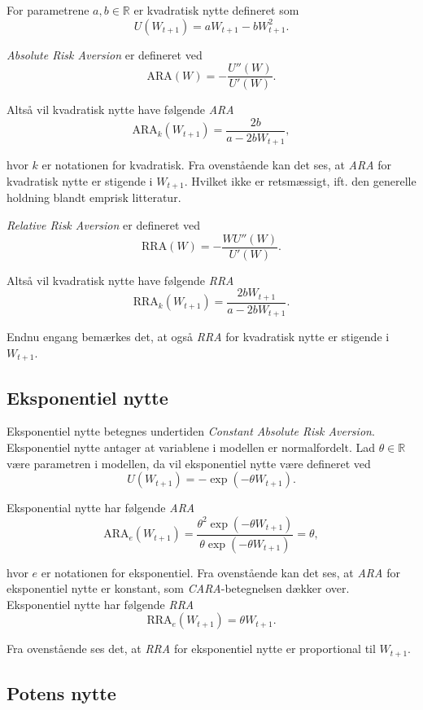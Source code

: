 \documentclass[
  a4paper,
  oneside]{memoir}
\begin{document}
For parametrene \(a,b\in\mathbb{R}\) er kvadratisk nytte defineret som
\begin{equation*}
U(W_{t+1})=aW_{t+1}-bW_{t+1}^2.
\end{equation*}

\emph{Absolute Risk Aversion} er defineret ved
\[\text{ARA}(W)=-\frac{U''(W)}{U'(W)}.\]

Altså vil kvadratisk nytte have følgende \emph{ARA}
\[\text{ARA}_k(W_{t+1})=\frac{2b}{a-2bW_{t+1}},\]

hvor \(k\) er notationen for kvadratisk. Fra ovenstående kan det ses, at \emph{ARA} for kvadratisk nytte er stigende i \(W_{t+1}\). Hvilket ikke er retsmæssigt, ift. den generelle holdning blandt emprisk litteratur.

\emph{Relative Risk Aversion} er defineret ved
\[\text{RRA}(W)=-\frac{WU''(W)}{U'(W)}.\]

Altså vil kvadratisk nytte have følgende \emph{RRA}
\[\text{RRA}_k(W_{t+1})= \frac{2bW_{t+1}}{a-2bW_{t+1}}.\]

Endnu engang bemærkes det, at også \emph{RRA} for kvadratisk nytte er stigende i \(W_{t+1}\).

\hypertarget{eksponentiel-nytte-1}{%
\subsection{Eksponentiel nytte}\label{eksponentiel-nytte-1}}

Eksponentiel nytte betegnes undertiden \emph{Constant Absolute Risk Aversion}. Eksponentiel nytte antager at variablene i modellen er normalfordelt. Lad \(\theta\in\mathbb{R}\) være parametren i modellen, da vil eksponentiel nytte være defineret ved
\begin{equation*}
U(W_{t+1})=-\exp\left(-\theta W_{t+1}\right).
\end{equation*}

Eksponential nytte har følgende \emph{ARA}
\[\text{ARA}_e(W_{t+1})=\frac{\theta^2\exp\left(-\theta W_{t+1}\right)}{\theta\exp\left(-\theta W_{t+1}\right)}=\theta,\]

hvor \(e\) er notationen for eksponentiel. Fra ovenstående kan det ses, at \emph{ARA} for eksponentiel nytte er konstant, som \emph{CARA}-betegnelsen dækker over. Eksponentiel nytte har følgende \emph{RRA}
\[\text{RRA}_e(W_{t+1})= \theta W_{t+1}.\]

Fra ovenstående ses det, at \emph{RRA} for eksponentiel nytte er proportional til \(W_{t+1}\).

\hypertarget{potens-nytte-1}{%
\subsection{Potens nytte}\label{potens-nytte-1}}
\end{document}
